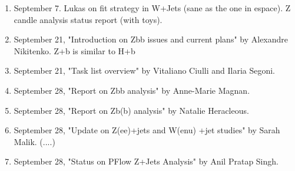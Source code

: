 \begin{enumerate}
\item September 7.  Lukas on fit strategy in W+Jets (sane as the one in espace).  Z candle analysis status report (with toys).
\item September 21, "Introduction on Zbb issues and current plans" by Alexandre Nikitenko.  Z+b is similar to H+b
\item September 21, "Task list overview" by Vitaliano Ciulli and Ilaria Segoni.
\item September 28, "Report on Zbb analysis" by Anne-Marie Magnan.
\item September 28, "Report on Zb(b) analysis" by Natalie Heracleous.
\item September 28, "Update on Z(ee)+jets and W(enu) +jet studies" by Sarah Malik. (....)
\item September 28, "Status on PFlow Z+Jets Analysis" by Anil Pratap Singh.
\end{enumerate}





